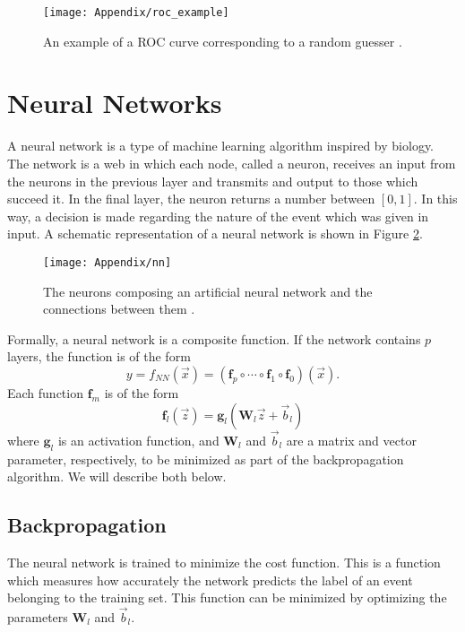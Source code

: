 \documentclass[10pt,a4paper]{book}
\begin{document}
\begin{figure}
\centering
\texttt{[image: Appendix/roc\_example]}
\caption{An example of a ROC curve corresponding to a random guesser \cite{burkov2019hundred}.}
\label{roc example}
\end{figure}

\section{Neural Networks}
A neural network is a type of machine learning algorithm inspired by biology. The network is a web in which each node, called a neuron, receives an input from the neurons in the previous layer and transmits and output to those which succeed it. In the final layer, the neuron returns a number between $[0,1]$. In this way, a decision is made regarding the nature of the event which was given in input.  A schematic representation of a neural network is shown in Figure \ref{nn image}.
\begin{figure}
\centering
\texttt{[image: Appendix/nn]}
\caption{The neurons composing an artificial neural network and the connections between them \cite{nn_image}.}
\label{nn image}
\end{figure}

Formally, a neural network is a composite function. If the network contains $p$ layers, the function is of the form
\begin{equation}
y = f_{NN}(\vec{x}) = \left( \mathbf{f}_p \circ \cdots \circ \mathbf{f}_1 \circ \mathbf{f}_0\right) (\vec{x}).
\label{NN equation}
\end{equation}
Each function $\mathbf{f}_m$ is of the form
\begin{equation}
\mathbf{f}_l (\vec{z}) = \mathbf{g}_l \left(\mathbf{W}_l\vec{z} + \vec{b}_l \right)
\label{activation function}
\end{equation}
where $\mathbf{g}_l$ is an activation function, and $\mathbf{W}_l$ and $\vec{b}_l$ are a matrix and vector parameter, respectively, to be minimized as part of the backpropagation algorithm. We will describe both below. 

\subsection{Backpropagation}
The neural network is trained to minimize the cost function. This is a function which measures how accurately the network predicts the label of an event belonging to the training set. This function can be minimized by optimizing the parameters $\mathbf{W}_l$ and $\vec{b}_l$. 
\end{document}
